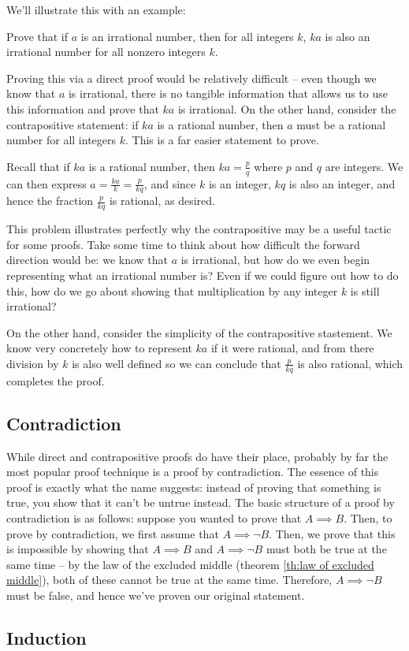 We'll illustrate this with an example:

\begin{example}{}{}
	Prove that if  \( a \) is an irrational number, then for all integers
	 \( k \), \( ka \) is also an irrational number for all nonzero integers \( k \). 


	 Proving this via a direct proof would be relatively difficult -- even though we know that \( a  \) is irrational, 
	 there is no tangible information that allows us to use this information and prove that \( ka \) is irrational.  
	 On the other hand, consider the contrapositive statement: if \( ka \) is a rational number, then
	 \( a  \) must be a rational number for all integers \( k \). This is a far easier statement to prove. 

	 Recall that if \( ka \) is a rational number, then \( ka = \frac{p}{q} \) where \( p \) and \( q \) are 
	 integers. We can then express \( a = \frac{ka}{k} = \frac{p}{kq} \), and since \( k  \) is an integer, 
	 \( kq \) is also an integer, and hence the fraction \( \frac{p}{kq} \) is rational, as desired. 
\end{example}

This problem illustrates perfectly why the contrapositive may be a useful tactic for some proofs. Take some time to 
think about how difficult the forward direction would be: we know that \( a  \) is irrational, but how do we even 
begin representing what an irrational number is? Even if we could figure out how to do this, how do we go about 
showing that multiplication by any integer \( k \) is still irrational? 

On the other hand, consider the simplicity of the contrapositive stastement. We know very concretely how to represent 
\( ka \) if it were rational, and from there division by \( k \) is also well defined so we can conclude 
that \( \frac{p}{kq} \) is also rational, which completes the proof.
\subsection{Contradiction}
While direct and contrapositive proofs do have their place, probably by far the most popular proof technique 
is a proof by contradiction. The essence of this proof is exactly what the name suggests: instead of proving that 
something is true, you show that it can't be untrue instead. The basic structure of a proof by contradiction 
is as follows: suppose you wanted to prove that \( A \implies B \). Then, to prove by contradiction, we first 
assume that \( A \implies \neg B \). Then, we prove that this is impossible by showing that \( A \implies B
\) and  \( A \implies \neg B  \) must both be true at the same time -- by the law of the excluded middle
(theorem \ref{th:law of excluded middle}), both of these cannot be true at the same time. Therefore, 
\( A \implies \neg B \) must be false, and hence we've proven our original statement. 
 

\subsection{Induction}
 

   
 
   
 
  
 

